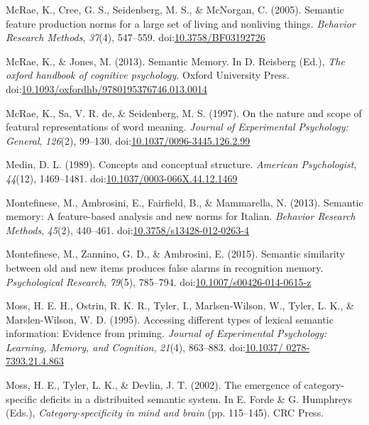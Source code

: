 \documentclass[english,,man]{apa6}
\begin{document}
\leavevmode\hypertarget{ref-McRae2005}{}%
McRae, K., Cree, G. S., Seidenberg, M. S., \& McNorgan, C. (2005). Semantic feature production norms for a large set of living and nonliving things. \emph{Behavior Research Methods}, \emph{37}(4), 547--559. doi:\href{https://doi.org/10.3758/BF03192726}{10.3758/BF03192726}

\leavevmode\hypertarget{ref-McRae2013}{}%
McRae, K., \& Jones, M. (2013). Semantic Memory. In D. Reisberg (Ed.), \emph{The oxford handbook of cognitive psychology}. Oxford University Press. doi:\href{https://doi.org/10.1093/oxfordhb/9780195376746.013.0014}{10.1093/oxfordhb/9780195376746.013.0014}

\leavevmode\hypertarget{ref-McRae1997}{}%
McRae, K., Sa, V. R. de, \& Seidenberg, M. S. (1997). On the nature and scope of featural representations of word meaning. \emph{Journal of Experimental Psychology: General}, \emph{126}(2), 99--130. doi:\href{https://doi.org/10.1037/0096-3445.126.2.99}{10.1037/0096-3445.126.2.99}

\leavevmode\hypertarget{ref-Medin1989}{}%
Medin, D. L. (1989). Concepts and conceptual structure. \emph{American Psychologist}, \emph{44}(12), 1469--1481. doi:\href{https://doi.org/10.1037/0003-066X.44.12.1469}{10.1037/0003-066X.44.12.1469}

\leavevmode\hypertarget{ref-Montefinese2013}{}%
Montefinese, M., Ambrosini, E., Fairfield, B., \& Mammarella, N. (2013). Semantic memory: A feature-based analysis and new norms for Italian. \emph{Behavior Research Methods}, \emph{45}(2), 440--461. doi:\href{https://doi.org/10.3758/s13428-012-0263-4}{10.3758/s13428-012-0263-4}

\leavevmode\hypertarget{ref-Montefinese2015}{}%
Montefinese, M., Zannino, G. D., \& Ambrosini, E. (2015). Semantic similarity between old and new items produces false alarms in recognition memory. \emph{Psychological Research}, \emph{79}(5), 785--794. doi:\href{https://doi.org/10.1007/s00426-014-0615-z}{10.1007/s00426-014-0615-z}

\leavevmode\hypertarget{ref-Moss1995}{}%
Moss, H. E. H., Ostrin, R. K. R., Tyler, I., Marlsen-Wilson, W., Tyler, L. K., \& Marslen-Wilson, W. D. (1995). Accessing different types of lexical semantic information: Evidence from priming. \emph{Journal of Experimental Psychology: Learning, Memory, and Cognition}, \emph{21}(4), 863--883. doi:\href{https://doi.org/10.1037/\%200278-7393.21.4.863}{10.1037/ 0278-7393.21.4.863}

\leavevmode\hypertarget{ref-Moss2002}{}%
Moss, H. E., Tyler, L. K., \& Devlin, J. T. (2002). The emergence of category-specific deficits in a distribuited semantic system. In E. Forde \& G. Humphreys (Eds.), \emph{Category-specificity in mind and brain} (pp. 115--145). CRC Press.
\end{document}
